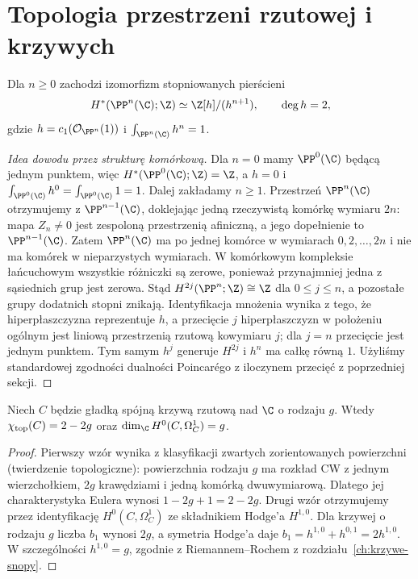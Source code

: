 \section{Topologia przestrzeni rzutowej i krzywych}
\label{sec:ga10-projektywne}

\begin{twierdzenie}
\label{tw:ga10-cp-cohom}
Dla $n\ge0$ zachodzi izomorfizm stopniowanych pierścieni
\[
 H^*(\PP^n(\C);\Z)\simeq\Z[h]/(h^{n+1}),
 \qquad \deg h=2,
\]
gdzie $h=c_1(\mathcal O_{\PP^n}(1))$ i
$\int_{\PP^n(\C)}h^n=1$.
\end{twierdzenie}
\begin{proof}[Idea dowodu przez strukturę komórkową]
Dla $n=0$ mamy $\PP^0(\C)$ będącą jednym punktem,
więc $H^*(\PP^0(\C);\Z)=\Z$, a $h=0$ i
$\int_{\PP^0(\C)}h^0=\int_{\PP^0(\C)}1=1$.
Dalej zakładamy $n\ge1$.
Przestrzeń $\PP^n(\C)$ otrzymujemy z
$\PP^{n-1}(\C)$, doklejając jedną rzeczywistą komórkę
wymiaru $2n$: mapa $Z_n\ne0$ jest zespoloną przestrzenią
afiniczną, a jego dopełnienie to $\PP^{n-1}(\C)$.
Zatem $\PP^n(\C)$ ma po jednej komórce
w wymiarach $0,2,\ldots,2n$ i nie ma komórek
w nieparzystych wymiarach. W komórkowym kompleksie
łańcuchowym wszystkie różniczki są zerowe,
ponieważ przynajmniej jedna z sąsiednich grup jest zerowa.
Stąd $H^{2j}(\PP^n;\Z)\cong\Z$ dla $0\le j\le n$,
a pozostałe grupy dodatnich stopni znikają.
Identyfikacja mnożenia wynika z tego, że hiperpłaszczyzna
reprezentuje $h$, a przecięcie $j$ hiperpłaszczyzn w
położeniu ogólnym jest liniową przestrzenią rzutową
kowymiaru $j$; dla $j=n$ przecięcie jest jednym punktem.
Tym samym $h^j$ generuje $H^{2j}$ i $h^n$ ma całkę równą $1$.
Użyliśmy standardowej zgodności dualności Poincarégo
z iloczynem przecięć z poprzedniej sekcji.
\end{proof}

\begin{stwierdzenie}
Niech $C$ będzie gładką spójną krzywą rzutową nad $\C$
o rodzaju $g$. Wtedy $\chi_{\rm top}(C)=2-2g$ oraz
$\dim_{\C}H^0(C,\Omega^1_C)=g$.
\end{stwierdzenie}
\begin{proof}
Pierwszy wzór wynika z klasyfikacji zwartych zorientowanych
powierzchni (twierdzenie topologiczne): powierzchnia rodzaju $g$
ma rozkład CW z jednym wierzchołkiem, $2g$ krawędziami
i jedną komórką dwuwymiarową. Dlatego jej charakterystyka
Eulera wynosi $1-2g+1=2-2g$.
Drugi wzór otrzymujemy przez identyfikację
$H^0(C,\Omega^1_C)$ ze składnikiem Hodge'a $H^{1,0}$.
Dla krzywej o rodzaju $g$ liczba $b_1$ wynosi $2g$,
a symetria Hodge'a daje $b_1=h^{1,0}+h^{0,1}=2h^{1,0}$.
W szczególności $h^{1,0}=g$, zgodnie z Riemannem--Rochem
z rozdziału~\ref{ch:krzywe-snopy}.
\end{proof}

